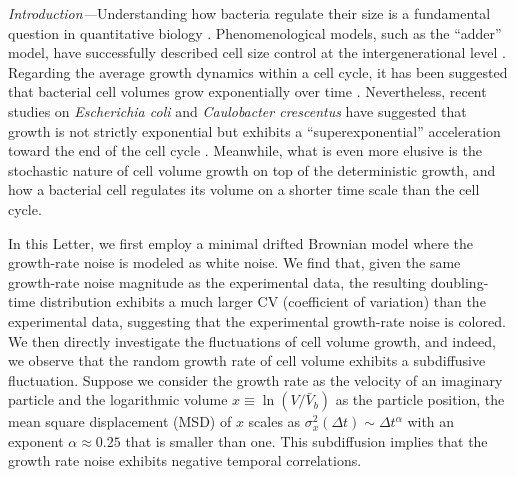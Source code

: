 \documentclass[aps, prl, twocolumn, longbibliography, linenumbers, superscriptaddress]{revtex4-2}
\newcommand{\blue}{\color{blue}}
\begin{document}
{\it Introduction---}Understanding how bacteria regulate their size is a fundamental question in quantitative biology \cite{Ho2018modeling, Cadart2019physics}. Phenomenological models, such as the ``adder'' model, have successfully described cell size control at the intergenerational level \cite{Amir2014cell, Campos2014constant, Taheri2015cell}. Regarding the average growth dynamics within a cell cycle, it has been suggested that bacterial cell volumes grow exponentially over time \cite{Wang2010robust, Godin2010using, Campos2014constant, Taheri2015cell}. Nevertheless, recent studies on {\it Escherichia coli} and {\it Caulobacter crescentus} have suggested that growth is not strictly exponential but exhibits a ``superexponential'' acceleration toward the end of the cell cycle \cite{Kar2021distinguishing, Cylke2023super, Cylke2025gene}. {\blue Meanwhile, what is even more elusive is the stochastic nature of cell volume growth on top of the deterministic growth, and how a bacterial cell regulates its volume on a shorter time scale than the cell cycle.}

In this Letter, we first employ a minimal drifted Brownian model where the growth-rate noise is modeled as white noise. {\blue We find that, given the same growth-rate noise magnitude as the experimental data, the resulting doubling-time distribution exhibits a much larger CV (coefficient of variation) than the experimental data, suggesting that the experimental growth-rate noise is colored. We then directly investigate the fluctuations of cell volume growth, and indeed, we observe that the random growth rate of cell volume exhibits a subdiffusive fluctuation.} Suppose we consider the growth rate as the velocity of an imaginary particle and the logarithmic volume $x \equiv \ln(V/\bar{V}_b)$ as the particle position, the mean square displacement (MSD) of $x$ scales as $\sigma^2_x (\Delta t) \sim \Delta t^{\alpha}$ with an exponent $\alpha \approx 0.25$ that is smaller than one. This subdiffusion implies that the growth rate noise exhibits negative temporal correlations.
\end{document}
